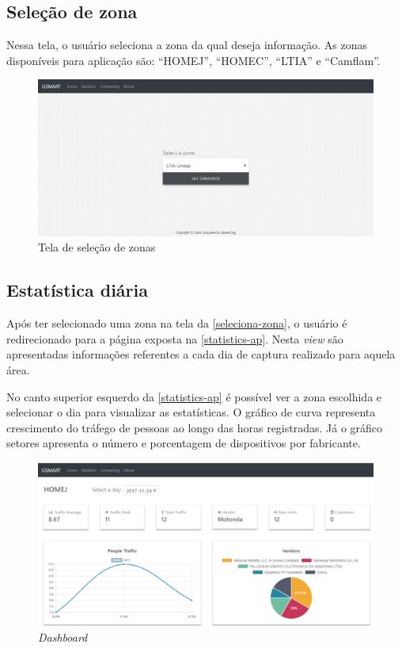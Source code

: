\subsection{Seleção de zona}
\label{seleciona-zona}
Nessa tela, o usuário seleciona a zona da qual deseja informação. As zonas disponíveis para aplicação são:
``HOMEJ'', ``HOMEC'', ``LTIA'' e ``Camflam''.

\begin{figure}[!h]
  \caption{\label{zones-ap}Tela de seleção de zonas}
  \begin{center}
    \includegraphics[width=1.0\textwidth]{img/zones.png}
  \end{center}
\end{figure}

\subsection{Estatística diária}
\label{diaria}
Após ter selecionado uma zona na tela da \autoref{seleciona-zona}, o usuário é
redirecionado para a página exposta na \autoref{statistics-ap}. Nesta
\emph{view} são apresentadas informações referentes a cada dia de captura
realizado para aquela área.

No canto superior esquerdo da \autoref{statistics-ap} é possível ver a zona
escolhida e selecionar o dia para visualizar as estatísticas. O gráfico de curva representa crescimento do tráfego de pessoas ao longo das
horas registradas. Já o gráfico setores apresenta o número e porcentagem de dispositivos por fabricante.

\begin{figure}[!h]
  \caption{\label{statistics-ap}\emph{Dashboard}}
  \begin{center}
    \includegraphics[width=1.0\textwidth]{img/statistics.png}
  \end{center}
\end{figure}

